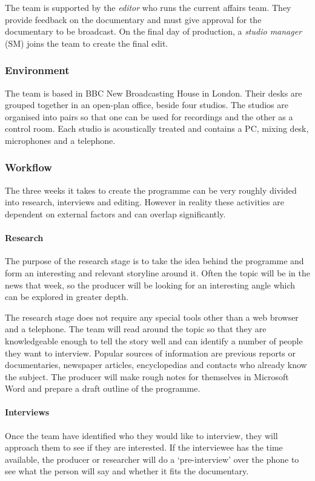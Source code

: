 The team is supported by the \textit{editor} who runs the current affairs team.  They provide feedback on the
documentary and must give approval for the documentary to be broadcast. On the final day of production, a
\textit{studio manager} (SM) joins the team to create the final edit.

\subsubsection{Environment}
The team is based in BBC New Broadcasting House in London. Their desks are grouped together in an open-plan office,
beside four studios. The studios are organised into pairs so that one can be used for recordings and the other as a
control room. Each studio is acoustically treated and contains a PC, mixing desk, microphones and a telephone.

\subsubsection{Workflow}
The three weeks it takes to create the programme can be very roughly divided into research, interviews and editing.
However in reality these activities are dependent on external factors and can overlap significantly.

\paragraph{Research}
The purpose of the research stage is to take the idea behind the programme and form an interesting and relevant
storyline around it. Often the topic will be in the news that week, so the producer will be looking for an interesting
angle which can be explored in greater depth.

The research stage does not require any special tools other than a web browser and a telephone. The team will read
around the topic so that they are knowledgeable enough to tell the story well and can identify a number of people they
want to interview. Popular sources of information are previous reports or documentaries, newspaper articles,
encyclopedias and contacts who already know the subject. The producer will make rough notes for themselves in Microsoft
Word and prepare a draft outline of the programme.

\paragraph{Interviews}
Once the team have identified who they would like to interview, they will approach them to see if they are interested.
If the interviewee has the time available, the producer or researcher will do a `pre-interview' over the phone to see
what the person will say and whether it fits the documentary.

